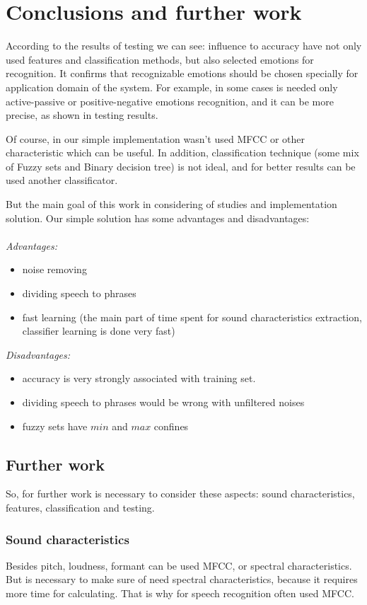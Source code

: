 \documentclass[14pt]{extarticle}
\begin{document}
\section{Conclusions and further work}
According to the results of testing we can see: influence to accuracy have not only used features and classification methods, but also selected emotions for recognition. It confirms that recognizable emotions should be chosen specially for application domain of the system. For example, in some cases is needed only active-passive or positive-negative emotions recognition, and it can be more precise, as shown in testing results.

Of course, in our simple implementation wasn't used MFCC or other characteristic which can be useful. In addition, classification technique (some mix of Fuzzy sets and Binary decision tree) is not ideal, and for better results can be used another classificator.

But the main goal of this work in considering of studies and implementation solution. Our simple solution has some advantages and disadvantages:\\\\
\textit{Advantages:}
\begin{itemize}
	\item noise removing
	\item dividing speech to phrases
	\item fast learning (the main part of time spent for sound characteristics extraction, classifier learning is done very fast)
\end{itemize}
\textit{Disadvantages:}
\begin{itemize}
	\item accuracy is very strongly associated with training set. 
	\item dividing speech to phrases would be wrong with unfiltered noises
	\item fuzzy sets have $min$ and $max$ confines
\end{itemize}

\subsection{Further work}
So, for further work is necessary to consider these aspects: sound characteristics, features, classification and testing.

\subsubsection{Sound characteristics}
Besides pitch, loudness, formant can be used MFCC, or spectral characteristics. But is necessary to  make sure of need spectral characteristics, because it requires more time for calculating. That is why for speech recognition often used MFCC.
\end{document}
